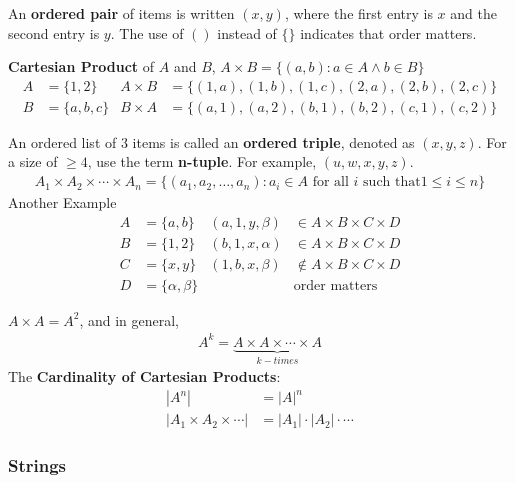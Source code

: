 An \textbf{ordered pair} of items is written $(x, y)$, where the first entry is $x$ and the second entry is $y$.
The use of $()$ instead of $\{\}$ indicates that order matters.

\noindent \textbf{Cartesian Product} of $A$ and $B$, $A \times B = \{(a, b) : a \in A \land b \in B\}$
\begin{align*}
  A & = \{1, 2\}    & A \times B & = \{(1, a), (1, b), (1, c), (2, a), (2, b), (2, c)\} \\
  B & = \{a, b, c\} & B \times A & = \{(a, 1), (a, 2), (b, 1), (b, 2), (c, 1), (c, 2)\}
\end{align*}

An ordered list of 3 items is called an \textbf{ordered triple}, denoted as $(x, y, z)$.
For a size of $\geq 4$, use the term \textbf{n-tuple}. For example, $(u, w, x, y, z)$.
\begin{align*}
  A_1 \times A_2 \times \cdots \times A_n = \{(a_1, a_2, \ldots, a_n) : a_i \in A \text{ for all $i$ such that} 1 \leq i \leq n\}
\end{align*}
Another Example
\begin{align*}
  A & = \{a, b\}          & (a, 1, y, \beta)  & \in A \times B \times C \times D      \\
  B & = \{1, 2\}          & (b, 1, x, \alpha) & \in A \times B \times C \times D      \\
  C & = \{x, y\}          & (1, b, x, \beta)  & \not \in A \times B \times C \times D \\
  D & = \{\alpha, \beta\} &                   & \text{order matters}
\end{align*}

$A \times A = A^2$, and in general,
\begin{align*}
  A^k = \underbrace{A \times A \times \cdots \times A}_{k-times}
\end{align*}
The \textbf{Cardinality of Cartesian Products}:
\begin{align*}
  \left\lvert A^n \right\rvert                           & = {\left\lvert A \right\rvert}^n                                               \\
  \left\lvert A_1 \times A_2 \times \cdots  \right\rvert & = \left\lvert A_1 \right\rvert \cdot \left\lvert A_2 \right\rvert \cdot \cdots
\end{align*}

\subsubsection{Strings}

